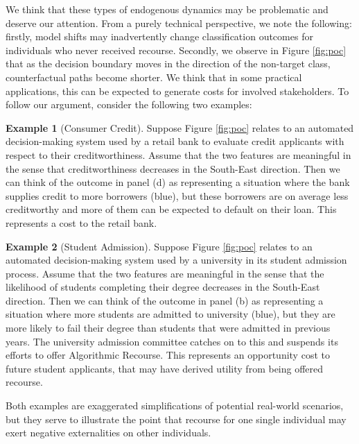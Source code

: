 \documentclass[conference,final,]{IEEEtran}
\theoremstyle{definition}
\theoremstyle{definition}
\newtheorem{example}{Example}[section]
\theoremstyle{definition}
\theoremstyle{definition}
\theoremstyle{remark}
\begin{document}
We think that these types of endogenous dynamics may be problematic and deserve our attention. From a purely technical perspective, we note the following: firstly, model shifts may inadvertently change classification outcomes for individuals who never received recourse. Secondly, we observe in Figure \ref{fig:poc} that as the decision boundary moves in the direction of the non-target class, counterfactual paths become shorter. We think that in some practical applications, this can be expected to generate costs for involved stakeholders. To follow our argument, consider the following two examples:

\begin{example}[Consumer Credit]
\protect\hypertarget{exm:consumer}{}\label{exm:consumer}Suppose Figure \ref{fig:poc} relates to an automated decision-making system used by a retail bank to evaluate credit applicants with respect to their creditworthiness. Assume that the two features are meaningful in the sense that creditworthiness decreases in the South-East direction. Then we can think of the outcome in panel (d) as representing a situation where the bank supplies credit to more borrowers (blue), but these borrowers are on average less creditworthy and more of them can be expected to default on their loan. This represents a cost to the retail bank.
\end{example}

\begin{example}[Student Admission]
\protect\hypertarget{exm:student}{}\label{exm:student}Suppose Figure \ref{fig:poc} relates to an automated decision-making system used by a university in its student admission process. Assume that the two features are meaningful in the sense that the likelihood of students completing their degree decreases in the South-East direction. Then we can think of the outcome in panel (b) as representing a situation where more students are admitted to university (blue), but they are more likely to fail their degree than students that were admitted in previous years. The university admission committee catches on to this and suspends its efforts to offer Algorithmic Recourse. This represents an opportunity cost to future student applicants, that may have derived utility from being offered recourse.
\end{example}

Both examples are exaggerated simplifications of potential real-world scenarios, but they serve to illustrate the point that recourse for one single individual may exert negative externalities on other individuals.
\end{document}
